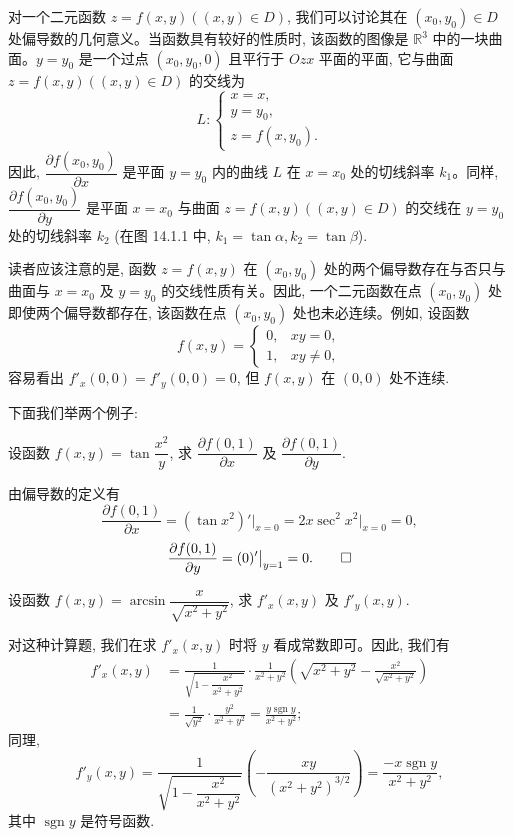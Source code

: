 对一个二元函数 $z=f(x,y)((x,y)\in D)$, 我们可以讨论其在 $(x_0,y_0)\in D$ 处偏导数的几何意义。当函数具有较好的性质时, 该函数的图像是 $\mathbb R^3$ 中的一块曲面。$y=y_0$ 是一个过点 $(x_0,y_0,0)$ 且平行于 $Ozx$ 平面的平面, 它与曲面 $z=f(x,y)((x,y)\in D)$ 的交线为
\[
  L:\begin{cases}
    x=x,\\
    y=y_0,\\
    z=f(x,y_0).
  \end{cases}
\]
因此, $\dfrac{\partial f(x_0,y_0)}{\partial x}$ 是平面 $y=y_0$ 内的曲线 $L$ 在 $x=x_0$ 处的切线斜率 $k_1$。同样, $\dfrac{\partial f(x_0,y_0)}{\partial y}$ 是平面 $x=x_0$ 与曲面 $z=f(x,y)((x,y)\in D)$ 的交线在 $y=y_0$ 处的切线斜率 $k_2$ (在图 14.1.1 中, $k_1=\tan\alpha, k_2=\tan\beta$).

读者应该注意的是, 函数 $z=f(x,y)$ 在 $(x_0,y_0)$ 处的两个偏导数存在与否只与曲面与 $x=x_0$ 及 $y=y_0$ 的交线性质有关。因此, 一个二元函数在点 $(x_0,y_0)$ 处即使两个偏导数都存在, 该函数在点 $(x_0,y_0)$ 处也未必连续。例如, 设函数
\[
  f(x,y)=
  \begin{cases}
    0, & xy=0,\\
    1, & xy\ne0,
  \end{cases}
\]
容易看出 $f'_x(0,0)=f'_y(0,0)=0$, 但 $f(x,y)$ 在 $(0,0)$ 处不连续.

下面我们举两个例子:

\begin{example}\label{example:ma-14-1-1}
设函数 $f(x,y)=\tan\dfrac{x^2}{y}$, 求 $\dfrac{\partial f(0,1)}{\partial x}$ 及 $\dfrac{\partial f(0,1)}{\partial y}$.
\end{example}


\begin{solve}
由偏导数的定义有
\[
  \frac{\partial f(0,1)}{\partial x}
  =(\tan x^2)'\big|_{x=0}
  =2x\sec^2 x^2\big|_{x=0}=0,
\]
\[
  \frac{\partial f(0,1)}{\partial y}
  =(0)'\big|_{y=1}=0.
\qedhere
\]
\end{solve}


\begin{example}\label{example:ma-14-1-2}
设函数 $f(x,y)=\arcsin\dfrac{x}{\sqrt{x^2+y^2}}$, 求 $f'_x(x,y)$ 及 $f'_y(x,y)$.
\end{example}


\begin{solve}
对这种计算题, 我们在求 $f'_x(x,y)$ 时将 $y$ 看成常数即可。因此, 我们有
\[
\begin{aligned}
  f'_x(x,y)
  &=
  \frac{1}{\sqrt{1-\dfrac{x^2}{x^2+y^2}}}\cdot
  \frac{1}{x^2+y^2}
  \left(\sqrt{x^2+y^2}-\frac{x^2}{\sqrt{x^2+y^2}}\right)\\
  &=\frac{1}{\sqrt{y^2}}\cdot\frac{y^2}{x^2+y^2}
  =\frac{y\operatorname{sgn} y}{x^2+y^2};
\end{aligned}
\]
同理,
\[
  f'_y(x,y)
  =
  \frac{1}{\sqrt{1-\dfrac{x^2}{x^2+y^2}}}
  \left(-\frac{xy}{(x^2+y^2)^{3/2}}\right)
  =\frac{-x\operatorname{sgn} y}{x^2+y^2},
\]
其中 $\operatorname{sgn} y$ 是符号函数.
\end{solve}



